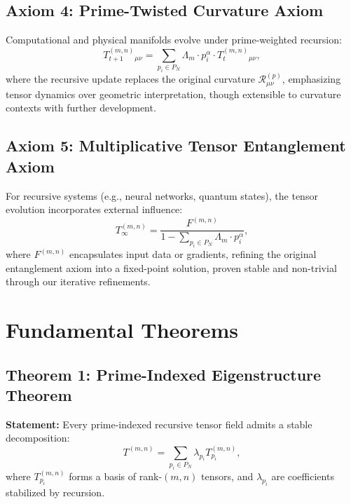 \documentclass{article}
\theoremstyle{plain}
\begin{document}
\subsection{Axiom 4: Prime-Twisted Curvature Axiom}
Computational and physical manifolds evolve under prime-weighted recursion:
\begin{equation}
    T_{t+1}^{(m,n)}{}_{\mu\nu} = \sum_{p_i \in P_N} \Lambda_m \cdot p_i^\alpha \cdot T_t^{(m,n)}{}_{\mu\nu},
\end{equation}
where the recursive update replaces the original curvature \( \mathcal{R}_{\mu\nu}^{(p)} \), emphasizing tensor dynamics over geometric interpretation, though extensible to curvature contexts with further development.

\subsection{Axiom 5: Multiplicative Tensor Entanglement Axiom}
For recursive systems (e.g., neural networks, quantum states), the tensor evolution incorporates external influence:
\begin{equation}
    T_\infty^{(m,n)} = \frac{F^{(m,n)}}{1 - \sum_{p_i \in P_N} \Lambda_m \cdot p_i^\alpha},
\end{equation}
where \( F^{(m,n)} \) encapsulates input data or gradients, refining the original entanglement axiom into a fixed-point solution, proven stable and non-trivial through our iterative refinements.

\section{Fundamental Theorems}

\subsection{Theorem 1: Prime-Indexed Eigenstructure Theorem}
\textbf{Statement:} Every prime-indexed recursive tensor field admits a stable decomposition:
\begin{equation}
    T^{(m,n)} = \sum_{p_i \in P_N} \lambda_{p_i} T_{p_i}^{(m,n)},
\end{equation}
where \( T_{p_i}^{(m,n)} \) forms a basis of rank-$(m,n)$ tensors, and \( \lambda_{p_i} \) are coefficients stabilized by recursion.
\end{document}
